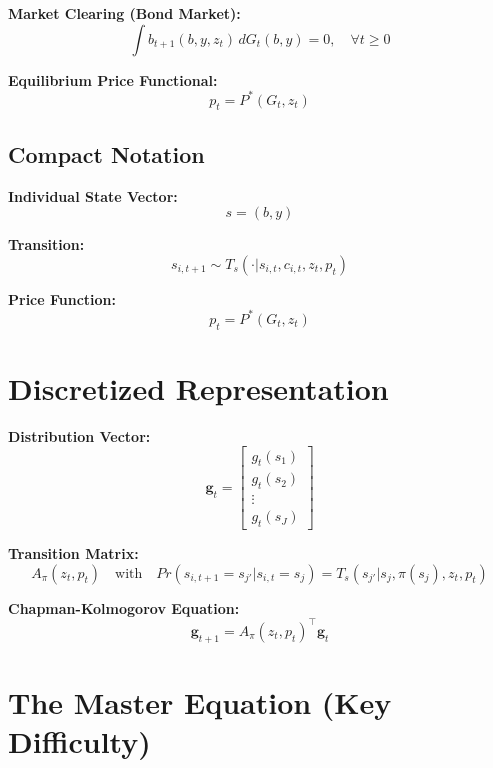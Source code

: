 \documentclass[12pt,a4paper]{article}
\begin{document}
\textbf{Market Clearing (Bond Market):}
\begin{equation}
\int b_{t+1}(b, y, z_t) \, dG_t(b, y) = 0, \quad \forall t \geq 0
\end{equation}

\textbf{Equilibrium Price Functional:}
\begin{equation}
p_t = P^*(G_t, z_t)
\end{equation}

\subsection{Compact Notation}

\textbf{Individual State Vector:}
\begin{equation}
s = (b, y)
\end{equation}

\textbf{Transition:}
\begin{equation}
s_{i,t+1} \sim T_s(\cdot|s_{i,t}, c_{i,t}, z_t, p_t)
\end{equation}

\textbf{Price Function:}
\begin{equation}
p_t = P^*(G_t, z_t)
\end{equation}

\section{Discretized Representation}

\textbf{Distribution Vector:}
\begin{equation}
\mathbf{g}_t = \begin{bmatrix} g_t(s_1) \\ g_t(s_2) \\ \vdots \\ g_t(s_J) \end{bmatrix}
\end{equation}

\textbf{Transition Matrix:}
\begin{equation}
A_{\pi}(z_t, p_t) \quad \text{with} \quad Pr(s_{i,t+1}=s_{j'}|s_{i,t}=s_j) = T_s(s_{j'}|s_j, \pi(s_j), z_t, p_t)
\end{equation}

\textbf{Chapman-Kolmogorov Equation:}
\begin{equation}
\mathbf{g}_{t+1} = A_{\pi}(z_t, p_t)^\top \mathbf{g}_t
\end{equation}

\section{The Master Equation (Key Difficulty)}
\end{document}
